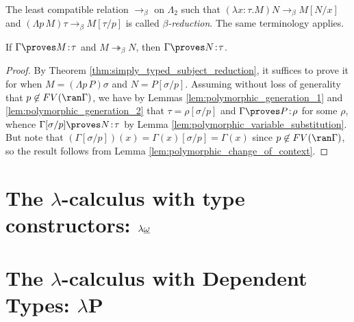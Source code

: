 \documentclass[reqno]{amsart}
\begin{document}
    \begin{definition}
        The least compatible relation $\rightarrow_\beta$ on $\Lambda_2$ such that $(\lambda x\!:\!\tau.M)N\rightarrow_\beta M[N/x]$ and $(\Lambda p\,M)\tau\rightarrow_\beta M[\tau/p]$ is called \textit{$\beta$-reduction}. The same terminology applies.
    \end{definition}

    \begin{theorem}\label{thm:polymorphic_subject_reduction}
        If $\Gamma\proves M\!:\!\tau$ and $M\twoheadrightarrow_\beta N$, then $\Gamma\proves N\!:\!\tau$.
    \end{theorem}
    \begin{proof}
        By Theorem \ref{thm:simply_typed_subject_reduction}, it suffices to prove it for when $M=(\Lambda p\,P)\sigma$ and $N=P[\sigma/p]$. Assuming without loss of generality that $p\not\in FV(\ran\Gamma)$, we have by Lemmas \ref{lem:polymorphic_generation_1} and \ref{lem:polymorphic_generation_2} that $\tau=\rho[\sigma/p]$ and $\Gamma\proves P\!:\!\rho$ for some $\rho$, whence $\Gamma[\sigma/p]\proves N\!:\!\tau$ by Lemma \ref{lem:polymorphic_variable_substitution}. But note that $(\Gamma[\sigma/p])(x)=\Gamma(x)[\sigma/p]=\Gamma(x)$ since $p\not\in FV(\ran\Gamma)$, so the result follows from Lemma \ref{lem:polymorphic_change_of_context}. 
    \end{proof}

    \section{The $\lambda$-calculus with type constructors: $\lambda\uline{\omega}$}

    \begin{definition}
        
    \end{definition}

    \begin{lemma}
        
    \end{lemma}

    \begin{theorem}

    \end{theorem}

    \section{The $\lambda$-calculus with Dependent Types: $\lambda\mathbf{P}$}
\end{document}
